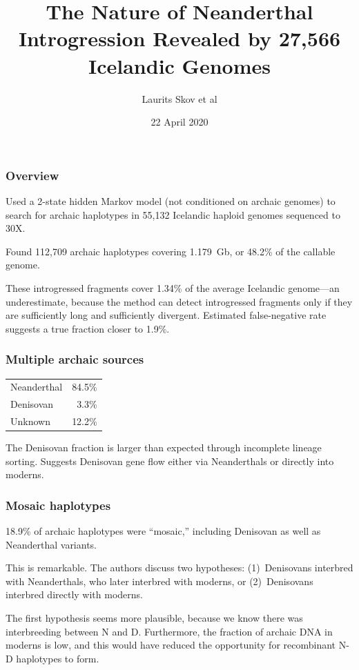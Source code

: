 \documentclass[pdftex,12pt]{beamer}
\begin{document}
\title{The Nature of Neanderthal Introgression Revealed by 27,566
  Icelandic Genomes}
\author{Laurits Skov et al}
\date{22 April 2020}

\frame{\titlepage}

\begin{frame}
  \frametitle{Overview}
  Used a 2-state hidden Markov model (not conditioned on archaic
  genomes) to search for archaic haplotypes in 55,132 Icelandic
  haploid genomes sequenced to 30X.

  \bigskip

  Found 112,709 archaic haplotypes covering 1.179~Gb, or 48.2\% of the
  callable genome.

  \bigskip

  These introgressed fragments cover 1.34\% of the average Icelandic
  genome---an underestimate, because the method can detect
  introgressed fragments only if they are sufficiently long and
  sufficiently divergent. Estimated false-negative rate suggests a
  true fraction closer to 1.9\%.

\end{frame}

\begin{frame}
  \frametitle{Multiple archaic sources}
  \begin{center}
  \begin{tabular}{lr}
    Neanderthal & 84.5\%\\
    Denisovan   & 3.3\%\\
    Unknown     & 12.2\%\\
  \end{tabular}
  \end{center}
The Denisovan fraction is larger than expected through incomplete
lineage sorting. Suggests Denisovan gene flow either via Neanderthals
or directly into moderns.
\end{frame}

\begin{frame}
  \frametitle{Mosaic haplotypes}

  18.9\% of archaic haplotypes were ``mosaic,'' including Denisovan as
  well as Neanderthal variants.

  \bigskip

  This is remarkable. The authors discuss two hypotheses:
  (1)~Denisovans interbred with Neanderthals, who later interbred with
  moderns, or (2)~Denisovans interbred directly with moderns.

  \bigskip

  The first hypothesis seems more plausible, because we know there was
  interbreeding between N and D. Furthermore, the fraction of archaic
  DNA in moderns is low, and this would have reduced the opportunity
  for recombinant N-D haplotypes to form.

\end{frame}
\end{document}
